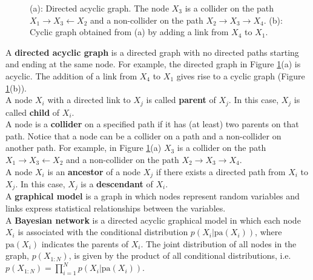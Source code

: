 \begin{figure}[t!]
\centering
{}
\hskip0.2cm
\caption{(a): Directed acyclic graph. The node $X_3$ is a collider on the path $X_1 \rightarrow X_3 \leftarrow X_2$ and a non-collider on the path $X_2\rightarrow X_3\rightarrow X_4$. (b): Cyclic graph obtained from (a) by adding a link from $X_4$ to $X_1$.}
\label{fig:indep_HMM}
\end{figure}

A {\bf directed acyclic graph} is a directed graph with no
directed paths starting and ending at the same node. For example, the directed graph in Figure \ref{fig:indep_HMM}(a) is acyclic. 
The addition of a link from $X_4$ to $X_1$ gives rise to a cyclic graph (Figure \ref{fig:indep_HMM}(b)).\\[5pt]
A node $X_i$ with a directed link to $X_j$ is called {\bf parent}
of $X_j$. In this case, $X_j$ is called {\bf child} of $X_i$.\\[5pt]
A node is a {\bf collider} on a specified path if it has (at least) two parents on that path.
Notice that a node can be a collider on a path and a non-collider on another path. For example, in Figure \ref{fig:indep_HMM}(a) $X_3$ is a collider on the path $X_1 \rightarrow X_3 \leftarrow X_2$ and a non-collider on the path $X_2\rightarrow X_3\rightarrow X_4$.\\[5pt]
A node $X_i$ is an {\bf ancestor} of a node $X_j$ if there exists a directed path from $X_i$ to $X_j$. In this case, $X_j$ is a {\bf descendant} of $X_i$.\\[5pt]
A {\bf graphical model} is a graph in which nodes represent random variables and links express statistical relationships between the variables.\\[5pt]
A {\bf Bayesian network} is a directed acyclic graphical model in which each node $X_i$ is associated
with the conditional distribution $p(X_i|\text{pa}(X_i))$, where $\text{pa}(X_i)$ indicates the parents of $X_i$. The joint distribution of all nodes in
the graph, $p(X_{1:N})$, is given by the product of all conditional distributions, i.e. $p(X_{1:N})=\prod_{i=1}^Np(X_i|\text{pa}(X_i))$.

